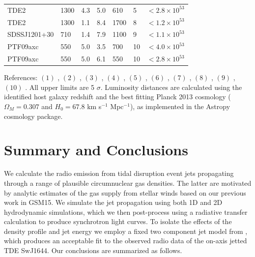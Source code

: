 \documentclass[usenatbib,fleqn]{mnras}
\begin{document}
\begin{table}
\begin{threeparttable}
\begin{tabular*}{1.5\columnwidth}{lllllll}
TDE2 & 1300 & 4.3 & 5.0 & 610 & 5 & $< 2.8 \times 10^{ 53 }$ \\
TDE2 & 1300 & 1.1 & 8.4 & 1700 & 8 & $< 1.2 \times 10^{ 53 }$ \\
SDSSJ1201+30 & 710 & 1.4 & 7.9 & 1100 & 9 & $< 1.1 \times 10^{ 53 }$ \\
PTF09axc & 550 & 5.0 & 3.5 & 700 & 10 & $< 4.0 \times 10^{ 53 }$ \\
PTF09axc & 550 & 5.0 & 6.1 & 550 & 10 & $< 2.8 \times 10^{ 53 }$\\
\end{tabular*}
\begin{tablenotes}
\item References: $(1)$ \citet{Alexander+2015, van-Velzen+2015}, $(2)$
  \citet{Berger+2012, Zauderer+2013} , $(3)$ \citet{Cenko+2012}, $(4)$
  \citet{Bower+2013}, $(5)$ \citet{van-Velzen+2013}, $(6)$
  \citet{Bade+1996, Komossa&Dahlem2001}, $(7)$
  \citet{Gezari+2008,Bower+2011}, $(8)$ \citet{van-Velzen+2011}, $(9)$
  \citet{Saxton+2012}, $(10)$ \citet{Arcavi+2014}. All upper limits
  are 5 $\sigma$. Luminosity distances are calculated using the
  identified host galaxy redshift and the best fitting Planck
  2013 cosmology ($\Omega_M=0.307$ and $H_0=67.8$ km s$^{-1}$
  Mpc$^{-1}$), as implemented in the Astropy cosmology package.
\end{tablenotes}
\end{threeparttable}
\end{table}

\section{Summary and Conclusions}
\label{sec:conc}

We calculate the radio emission from tidal disruption event jets
propagating through a range of plausible circumnuclear gas densities.
The latter are motivated by analytic estimates of the gas supply from
stellar winds based on our previous work in GSM15.  We simulate the
jet propagation using both 1D and 2D hydrodynamic simulations, which
we then post-process using a radiative transfer calculation to produce
synchrotron light curves. To isolate the effects of the density
profile and jet energy we employ a fixed two component jet model from
\citet{Mimica+2015}, which produces an acceptable fit to the observed
radio data of the on-axis jetted TDE SwJ1644.  Our conclusions are
summarized as follows.
\end{document}
